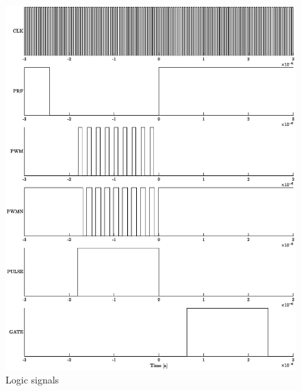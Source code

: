 \begin{figure}[htbp]
	\centering
	\includegraphics[width=\linewidth]{Figures/5_controlsystem_fpga_pulser_logic.eps}
	\caption{Logic signals}
	\label{fig:5_controlsystem_pulser_logic}
\end{figure}

